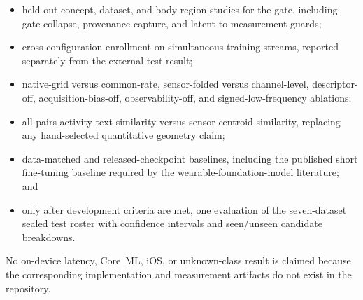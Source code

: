 \begin{itemize}
  \item held-out concept, dataset, and body-region studies for the gate, including gate-collapse,
        provenance-capture, and latent-to-measurement guards;
  \item cross-configuration enrollment on simultaneous training streams, reported separately from
        the external test result;
  \item native-grid versus common-rate, sensor-folded versus channel-level, descriptor-off,
        acquisition-bias-off, observability-off, and signed-low-frequency ablations;
  \item all-pairs activity-text similarity versus sensor-centroid similarity, replacing any
        hand-selected quantitative geometry claim;
  \item data-matched and released-checkpoint baselines, including the published short fine-tuning
        baseline required by the wearable-foundation-model literature; and
  \item only after development criteria are met, one evaluation of the seven-dataset sealed test
        roster with confidence intervals and seen/unseen candidate breakdowns.
\end{itemize}

No on-device latency, Core~ML, iOS, or unknown-class result is claimed because the corresponding
implementation and measurement artifacts do not exist in the repository.
